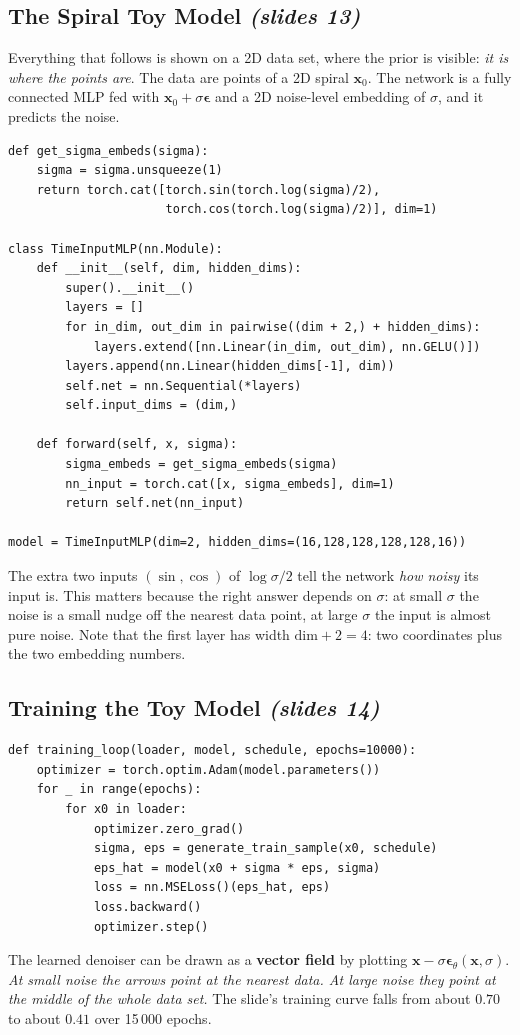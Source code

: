 \documentclass[11pt,a4paper]{article}
\numberwithin{equation}{section}
\newcommand{\slides}[1]{\texorpdfstring{\;\emph{(slides #1)}}{ (slides #1)}}
\newcommand{\bx}{\bm{x}}
\newcommand{\beps}{\bm{\epsilon}}
\theoremstyle{plain}
\theoremstyle{definition}
\begin{document}
\subsection{The Spiral Toy Model \slides{13}}
Everything that follows is shown on a 2D data set, where the prior is visible: \emph{it is where the points are}. The data are points of a 2D spiral $\bx_0$. The network is a fully connected MLP fed with $\bx_0+\sigma\beps$ and a 2D noise-level embedding of $\sigma$, and it predicts the noise.

\begin{lstlisting}
def get_sigma_embeds(sigma):
    sigma = sigma.unsqueeze(1)
    return torch.cat([torch.sin(torch.log(sigma)/2),
                      torch.cos(torch.log(sigma)/2)], dim=1)

class TimeInputMLP(nn.Module):
    def __init__(self, dim, hidden_dims):
        super().__init__()
        layers = []
        for in_dim, out_dim in pairwise((dim + 2,) + hidden_dims):
            layers.extend([nn.Linear(in_dim, out_dim), nn.GELU()])
        layers.append(nn.Linear(hidden_dims[-1], dim))
        self.net = nn.Sequential(*layers)
        self.input_dims = (dim,)

    def forward(self, x, sigma):
        sigma_embeds = get_sigma_embeds(sigma)
        nn_input = torch.cat([x, sigma_embeds], dim=1)
        return self.net(nn_input)

model = TimeInputMLP(dim=2, hidden_dims=(16,128,128,128,128,16))
\end{lstlisting}

\begin{intuition}
The extra two inputs $(\sin,\cos)$ of $\log\sigma/2$ tell the network \emph{how noisy} its input is. This matters because the right answer depends on $\sigma$: at small $\sigma$ the noise is a small nudge off the nearest data point, at large $\sigma$ the input is almost pure noise. Note that the first layer has width $\text{dim}+2=4$: two coordinates plus the two embedding numbers.
\end{intuition}

\subsection{Training the Toy Model \slides{14}}
\begin{lstlisting}
def training_loop(loader, model, schedule, epochs=10000):
    optimizer = torch.optim.Adam(model.parameters())
    for _ in range(epochs):
        for x0 in loader:
            optimizer.zero_grad()
            sigma, eps = generate_train_sample(x0, schedule)
            eps_hat = model(x0 + sigma * eps, sigma)
            loss = nn.MSELoss()(eps_hat, eps)
            loss.backward()
            optimizer.step()
\end{lstlisting}
The learned denoiser can be drawn as a \textbf{vector field} by plotting $\bx-\sigma\beps_\theta(\bx,\sigma)$. \emph{At small noise the arrows point at the nearest data. At large noise they point at the middle of the whole data set.} The slide's training curve falls from about $0.70$ to about $0.41$ over 15\,000 epochs.
\end{document}

